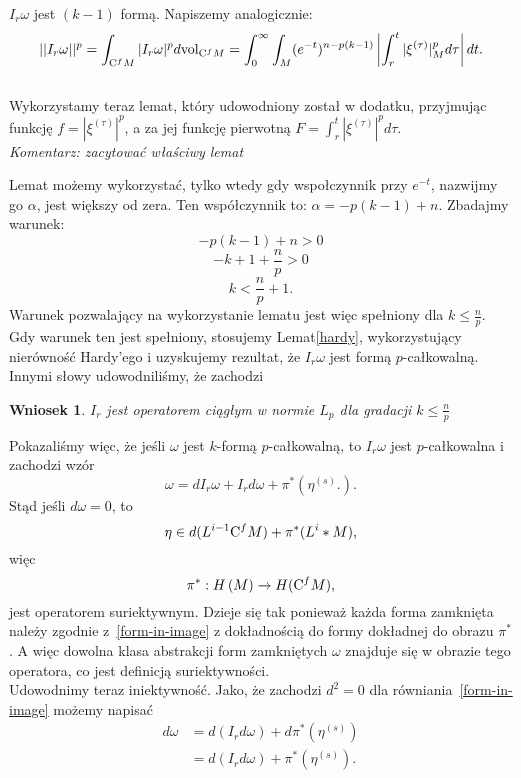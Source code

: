 \documentclass[licencjacka]{pracamgr}
\theoremstyle{definition}
\theoremstyle{definition}
\theoremstyle{plain}
\theoremstyle{plain}
\theoremstyle{plain}
\theoremstyle{plain}
\newtheorem{wniosek}{Wniosek}[section]
\def\cfm{\ensuremath\mathrm{C}^fM}
\def\M{\ensuremath M}
\begin{document}
$I_r \omega$ jest $(k-1)$ formą. Napiszemy analogicznie:
\[
    ||I_r \omega ||^p = 
    \int_{\cfm} |I_r \omega|^p  d\text{vol}_{\cfm} =
    \int_0^\infty \int_{\M} 
        (e^{-t})^{n-p(k-1)}
      \left| \int_r^t |\xi^{(\tau)} |^p_{\M} d\tau \right| dt.
\] \\

Wykorzystamy teraz lemat, który udowodniony został w dodatku, przyjmując
funkcję $f = |\xi^{(\tau)} |^p$, a za jej funkcję pierwotną 
$F = \int_r^t |\xi^{(\tau)}|^p d \tau $. \\
\emph{Komentarz: zacytować właściwy lemat}

Lemat możemy wykorzystać, tylko wtedy gdy 
wspołczynnik przy $e^{-t}$, nazwijmy go $\alpha$, jest większy od zera. Ten współczynnik to:
$\alpha = -p(k-1) + n$. Zbadajmy warunek:
\[
    -p(k-1) + n > 0
\]
\[
    -k + 1 + \frac{n}{p} > 0
\]
\[
    k < \frac{n}{p} + 1.
\]
Warunek pozwalający na wykorzystanie lematu jest więc spełniony dla $k \leq
\frac{n}{p}$. \\

Gdy warunek ten jest spełniony, stosujemy Lemat\ref{hardy},
wykorzystujący nierówność Hardy'ego i uzyskujemy rezultat, że $I_r \omega$ jest formą $p$-całkowalną. \\
Innymi słowy udowodniliśmy, że zachodzi
\begin{wniosek}
$I_r$ jest operatorem ciągłym w normie $L_p$ dla gradacji $k \leq \frac{n}{p}$
\end{wniosek}

Pokazaliśmy więc, że jeśli $\omega$ jest $k$-formą $p$-całkowalną, to  $I_r \omega$ jest
$p$-całkowalna i zachodzi wzór
\[
    \omega = dI_r \omega + I_r d \omega + \pi^\ast 
    \left(
        \eta^{(s)}.
    \right).
\]
Stąd jeśli $d \omega = 0$, to 
\[\label{form-in-image}
    \eta \in d(L^{i-1} \cfm) + \pi^\ast (L^i*\M),
\]
więc 
\[
    \pi^\ast: H \left( \M \right) \rightarrow H ( \cfm ),
\]
jest operatorem suriektywnym. Dzieje się tak ponieważ każda forma zamknięta
należy zgodnie z~\ref{form-in-image} z dokładnością do formy dokładnej do
obrazu $\pi^\ast$. A więc dowolna klasa abstrakcji form zamkniętych $\omega$
znajduje się w obrazie tego operatora, co jest definicją suriektywności. \\

Udowodnimy teraz iniektywność.
Jako, że zachodzi $d^2 = 0$ dla równiania~\ref{form-in-image}
możemy napisać
\begin{align*}
d \omega &= d(I_rd\omega) + d\pi^\ast( \eta^{(s)}) \\
         &= d(I_rd\omega) + \pi^\ast( \eta^{(s)}). \\
\end{align*}
\end{document}
